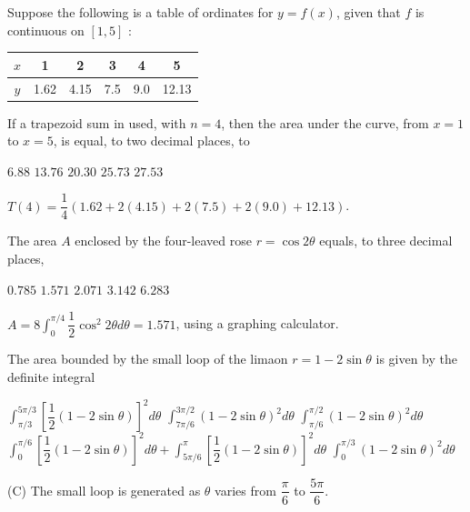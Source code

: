 \question
Suppose the following is a table of ordinates for $y=f(x)$, given that $f$ is continuous on $[1,5]$ :

\begin{center}
\begin{tabular}{c|ccccc}
$x$ & 1 & 2 & 3 & 4 & 5 \\
\hline
$y$ & 1.62 & 4.15 & 7.5 & 9.0 & 12.13 \\
\end{tabular}
\end{center}

If a trapezoid sum in used, with $n=4$, then the area under the curve, from $x=1$ to $x=5$, is equal, to two decimal places, to
\begin{choices}
  \choice $6.88$
  \choice $13.76$
  \choice $20.30$
  \choice $25.73$
  \CorrectChoice $27.53$
\end{choices}
\begin{solution}
$T(4)=\dfrac{1}{4}(1.62+2(4.15)+2(7.5)+2(9.0)+12.13)$.
\end{solution}

\newpage


\question
The area $A$ enclosed by the four-leaved rose $r=\cos 2 \theta$ equals, to three decimal places,
\begin{choices}
  \choice $0.785$
  \CorrectChoice $1.571$
  \choice $2.071$
  \choice $3.142$
  \choice $6.283$
\end{choices}
\begin{solution}
$A=8 \int_{0}^{\pi / 4} \dfrac{1}{2} \cos ^{2} 2 \theta d \theta=1.571$, using a graphing calculator.
\end{solution}

\question
The area bounded by the small loop of the limaon $r=1-2 \sin \theta$ is given by the definite integral
\begin{choices}
  \choice $\int_{\pi / 3}^{5 \pi / 3}\left[\dfrac{1}{2}(1-2 \sin \theta)\right]^{2} d \theta$
  \choice $\int_{7 \pi / 6}^{3 \pi / 2}(1-2 \sin \theta)^{2} d \theta$
  \CorrectChoice $\int_{\pi / 6}^{\pi / 2}(1-2 \sin \theta)^{2} d \theta$
  \choice $\int_{0}^{\pi / 6}\left[\dfrac{1}{2}(1-2 \sin \theta)\right]^{2} d \theta+\int_{5 \pi / 6}^{\pi}\left[\dfrac{1}{2}(1-2 \sin \theta)\right]^{2} d \theta$
  \choice $\int_{0}^{\pi / 3}(1-2 \sin \theta)^{2} d \theta$
\end{choices}
\begin{solution}
(C) The small loop is generated as $\theta$ varies from $\dfrac{\pi}{6}$ to $\dfrac{5 \pi}{6}$.
\end{solution}

